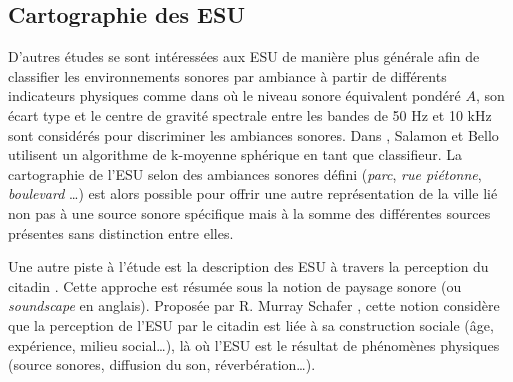 \subsection{Cartographie des ESU}

D'autres études se sont intéressées aux ESU de manière plus générale afin de classifier les environnements sonores par ambiance à partir de différents indicateurs physiques comme dans \cite{can_describing_2015} où le niveau sonore équivalent pondéré $A$, son écart type et le centre de gravité spectrale entre les bandes de 50 Hz et 10 kHz sont considérés pour discriminer les ambiances sonores. Dans \cite{salamon2015unsupervised}, Salamon et Bello utilisent un algorithme de k-moyenne sphérique en tant que classifieur. 
La cartographie de l'ESU selon des ambiances sonores défini (\textit{parc}, \textit{rue piétonne}, \textit{boulevard} \dots) est alors possible pour offrir une autre représentation de la ville lié non pas à une source sonore spécifique mais à la somme des différentes sources présentes sans distinction entre elles.  

Une autre piste à l'étude est la description des ESU à travers la perception du citadin \cite{brocolini_measurements_2013}.
Cette approche est résumée sous la notion de paysage sonore (ou \textit{soundscape} en anglais). Proposée par R. Murray Schafer \cite{schafer1977tuning}, cette notion considère que la perception de l'ESU par le citadin est liée à sa construction sociale (âge, expérience, milieu social\dots), là où l'ESU est le résultat de phénomènes physiques (source sonores, diffusion du son, réverbération\dots). 

